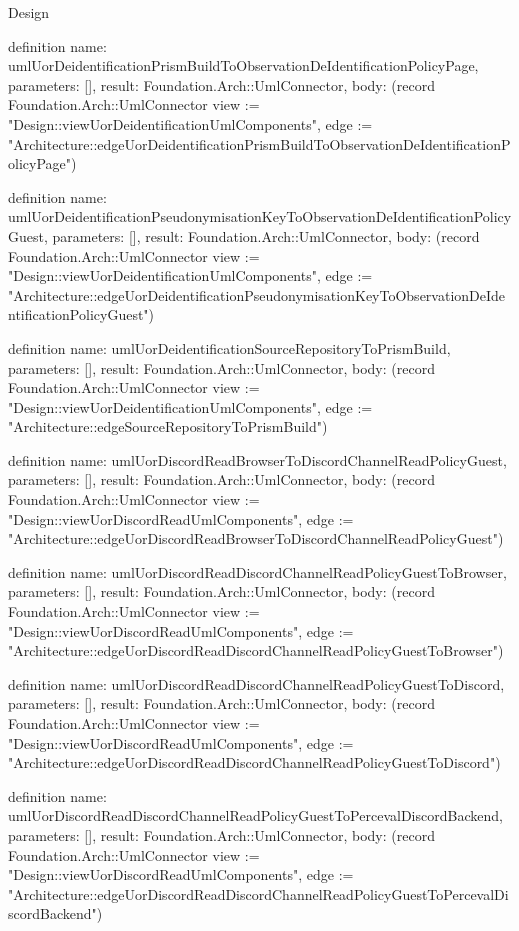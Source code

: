 \begin{lexlean}{Design}
\begin{semanticmodule}
definition{
  name: umlUorDeidentificationPrismBuildToObservationDeIdentificationPolicyPage,
  parameters: [],
  result: Foundation.Arch::UmlConnector,
  body: (record Foundation.Arch::UmlConnector {view := "Design::viewUorDeidentificationUmlComponents", edge := "Architecture::edgeUorDeidentificationPrismBuildToObservationDeIdentificationPolicyPage"})
}

definition{
  name: umlUorDeidentificationPseudonymisationKeyToObservationDeIdentificationPolicyGuest,
  parameters: [],
  result: Foundation.Arch::UmlConnector,
  body: (record Foundation.Arch::UmlConnector {view := "Design::viewUorDeidentificationUmlComponents", edge := "Architecture::edgeUorDeidentificationPseudonymisationKeyToObservationDeIdentificationPolicyGuest"})
}

definition{
  name: umlUorDeidentificationSourceRepositoryToPrismBuild,
  parameters: [],
  result: Foundation.Arch::UmlConnector,
  body: (record Foundation.Arch::UmlConnector {view := "Design::viewUorDeidentificationUmlComponents", edge := "Architecture::edgeSourceRepositoryToPrismBuild"})
}

definition{
  name: umlUorDiscordReadBrowserToDiscordChannelReadPolicyGuest,
  parameters: [],
  result: Foundation.Arch::UmlConnector,
  body: (record Foundation.Arch::UmlConnector {view := "Design::viewUorDiscordReadUmlComponents", edge := "Architecture::edgeUorDiscordReadBrowserToDiscordChannelReadPolicyGuest"})
}

definition{
  name: umlUorDiscordReadDiscordChannelReadPolicyGuestToBrowser,
  parameters: [],
  result: Foundation.Arch::UmlConnector,
  body: (record Foundation.Arch::UmlConnector {view := "Design::viewUorDiscordReadUmlComponents", edge := "Architecture::edgeUorDiscordReadDiscordChannelReadPolicyGuestToBrowser"})
}

definition{
  name: umlUorDiscordReadDiscordChannelReadPolicyGuestToDiscord,
  parameters: [],
  result: Foundation.Arch::UmlConnector,
  body: (record Foundation.Arch::UmlConnector {view := "Design::viewUorDiscordReadUmlComponents", edge := "Architecture::edgeUorDiscordReadDiscordChannelReadPolicyGuestToDiscord"})
}

definition{
  name: umlUorDiscordReadDiscordChannelReadPolicyGuestToPercevalDiscordBackend,
  parameters: [],
  result: Foundation.Arch::UmlConnector,
  body: (record Foundation.Arch::UmlConnector {view := "Design::viewUorDiscordReadUmlComponents", edge := "Architecture::edgeUorDiscordReadDiscordChannelReadPolicyGuestToPercevalDiscordBackend"})
}


\end{semanticmodule}
\end{lexlean}
